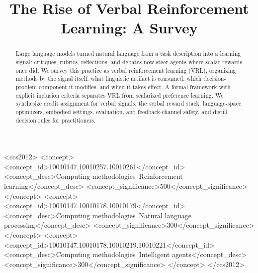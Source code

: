 \title[Verbal Reinforcement Learning]{The Rise of Verbal Reinforcement Learning: A Survey}

\begin{abstract}
Large language models turned natural language from a task description into a learning signal: critiques, rubrics, reflections, and debates now steer agents where scalar rewards once did. We survey this practice as verbal reinforcement learning (VRL), organizing methods by the signal itself: what linguistic artifact is consumed, which decision-problem component it modifies, and when it takes effect. A formal framework with explicit inclusion criteria separates VRL from scalarized preference learning. We synthesize credit assignment for verbal signals, the verbal reward stack, language-space optimizers, embodied settings, evaluation, and feedback-channel safety, and distill decision rules for practitioners.
\end{abstract}

\begin{CCSXML}
<ccs2012>
  <concept>
    <concept_id>10010147.10010257.10010261</concept_id>
    <concept_desc>Computing methodologies~Reinforcement learning</concept_desc>
    <concept_significance>500</concept_significance>
  </concept>
  <concept>
    <concept_id>10010147.10010178.10010179</concept_id>
    <concept_desc>Computing methodologies~Natural language processing</concept_desc>
    <concept_significance>300</concept_significance>
  </concept>
  <concept>
    <concept_id>10010147.10010178.10010219.10010221</concept_id>
    <concept_desc>Computing methodologies~Intelligent agents</concept_desc>
    <concept_significance>300</concept_significance>
  </concept>
</ccs2012>
\end{CCSXML}


